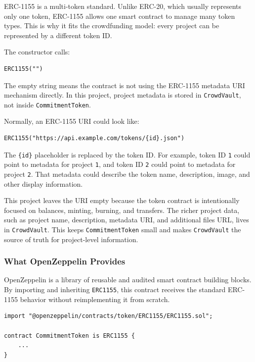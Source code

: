 \documentclass[11pt,a4paper]{article}
\begin{document}
ERC-1155 is a multi-token standard. Unlike ERC-20, which usually represents only one token, ERC-1155 allows one smart contract to manage many token types. This is why it fits the crowdfunding model: every project can be represented by a different token ID.

The constructor calls:

\begin{lstlisting}
ERC1155("")
\end{lstlisting}

The empty string means the contract is not using the ERC-1155 metadata URI mechanism directly. In this project, project metadata is stored in \texttt{CrowdVault}, not inside \texttt{CommitmentToken}.

Normally, an ERC-1155 URI could look like:

\begin{lstlisting}
ERC1155("https://api.example.com/tokens/{id}.json")
\end{lstlisting}

The \texttt{\{id\}} placeholder is replaced by the token ID. For example, token ID \texttt{1} could point to metadata for project \texttt{1}, and token ID \texttt{2} could point to metadata for project \texttt{2}. That metadata could describe the token name, description, image, and other display information.

This project leaves the URI empty because the token contract is intentionally focused on balances, minting, burning, and transfers. The richer project data, such as project name, description, metadata URI, and additional files URL, lives in \texttt{CrowdVault}. This keeps \texttt{CommitmentToken} small and makes \texttt{CrowdVault} the source of truth for project-level information.

\subsubsection{What OpenZeppelin Provides}

OpenZeppelin is a library of reusable and audited smart contract building blocks. By importing and inheriting \texttt{ERC1155}, this contract receives the standard ERC-1155 behavior without reimplementing it from scratch.

\begin{lstlisting}
import "@openzeppelin/contracts/token/ERC1155/ERC1155.sol";

contract CommitmentToken is ERC1155 {
    ...
}
\end{lstlisting}
\end{document}

